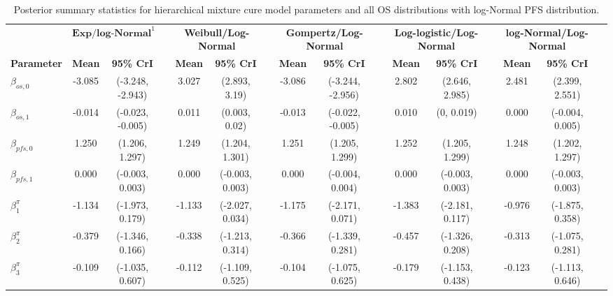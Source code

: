 \documentclass[AMA,STIX1COL]{WileyNJD-v2}
\begin{document}
\begin{landscape}
\begin{center}
\begin{table}[t]
\caption{Posterior summary statistics for hierarchical mixture cure model parameters and all OS distributions with log-Normal PFS distribution. \label{tab:post_hier_pfs_lnormal}}
\centering
\begin{tabular}{l c c c c c c c c c c c c c c c}
\toprule
\multicolumn{1}{l}{} & \multicolumn{2}{c}{$\textbf{Exp/log-Normal}^1$} & & \multicolumn{2}{c}{\textbf{Weibull/Log-Normal}} & & \multicolumn{2}{c}{\textbf{Gompertz/Log-Normal}} & & \multicolumn{2}{c}{\textbf{Log-logistic/Log-Normal}} & & \multicolumn{2}{c}{\textbf{log-Normal/Log-Normal}}\\
\cmidrule{2-3}\cmidrule{5-6}\cmidrule{8-9}\cmidrule{11-12}\cmidrule{14-15}
\textbf{Parameter} & \textbf{Mean} & \textbf{95\% CrI} & & \textbf{Mean} & \textbf{95\% CrI} & & \textbf{Mean} & \textbf{95\% CrI} & & \textbf{Mean} & \textbf{95\% CrI} & & \textbf{Mean} & \textbf{95\% CrI}\\
\midrule
$\beta_{os, 0}$ & -3.085 & (-3.248, -2.943) &  & 3.027 & (2.893, 3.19) &  & -3.086 & (-3.244, -2.956) &  & 2.802 & (2.646, 2.985) &  & 2.481 & (2.399, 2.551) & \\
$\beta_{os, 1}$ & -0.014 & (-0.023, -0.005) &  & 0.011 & (0.003, 0.02) &  & -0.013 & (-0.022, -0.005) &  & 0.010 & (0, 0.019) &  & 0.000 & (-0.004, 0.005) & \\
$\beta_{pfs, 0}$ & 1.250 & (1.206, 1.297) &  & 1.249 & (1.204, 1.301) &  & 1.251 & (1.205, 1.299) &  & 1.252 & (1.205, 1.299) &  & 1.248 & (1.202, 1.297) & \\
$\beta_{pfs, 1}$ & 0.000 & (-0.003, 0.003) &  & 0.000 & (-0.003, 0.003) &  & 0.000 & (-0.004, 0.004) &  & 0.000 & (-0.003, 0.003) &  & 0.000 & (-0.003, 0.003) & \\
$\beta^{\pi}_1$ & -1.134 & (-1.973, 0.179) &  & -1.133 & (-2.027, 0.034) &  & -1.175 & (-2.171, 0.071) &  & -1.383 & (-2.181, 0.117) &  & -0.976 & (-1.875, 0.358) & \\
$\beta^{\pi}_2$ & -0.379 & (-1.346, 0.166) &  & -0.338 & (-1.213, 0.314) &  & -0.366 & (-1.339, 0.281) &  & -0.457 & (-1.326, 0.208) &  & -0.313 & (-1.075, 0.281) & \\
$\beta^{\pi}_3$ & -0.109 & (-1.035, 0.607) &  & -0.112 & (-1.109, 0.525) &  & -0.104 & (-1.075, 0.625) &  & -0.179 & (-1.153, 0.438) &  & -0.123 & (-1.113, 0.646) & \\

\end{tabular}
\end{table}
\end{center}
\end{landscape}
\end{document}
